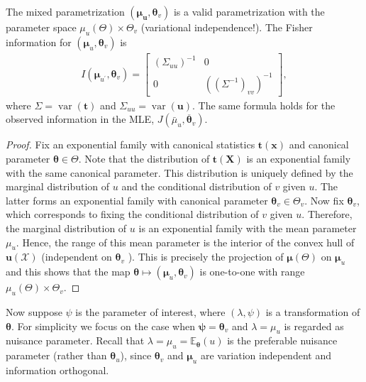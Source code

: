 \begin{prop}
    The mixed parametrization $(\boldsymbol{\mu}_{\boldsymbol{u}}, \boldsymbol{\theta}_v)$ is a valid parametrization with the parameter space $\mu_u(\Theta) \times \Theta_v$ (variational independence!). The Fisher information for $(\boldsymbol{\mu}_u, \boldsymbol{\theta}_v)$ is
\begin{align*}
I\left(\boldsymbol{\mu}_{u^{\prime}}, \boldsymbol{\theta}_v\right)=\left[\begin{array}{cc}
\left(\Sigma_{u u}\right)^{-1} & 0 \\
0 & \left(\left(\Sigma^{-1}\right)_{v v}\right)^{-1}
\end{array}\right],
\end{align*}
where $\Sigma=\operatorname{var}(\mathbf{t})$ and $\Sigma_{u u}=\operatorname{var}(\boldsymbol{u})$. The same formula holds for the observed information in the MLE, $J\left(\bar{\mu}_u, \overline{\boldsymbol{\theta}}_v\right)$.
\end{prop}

\begin{proof}
Fix an exponential family with canonical statistics $\mathbf{t}(\mathbf{x})$ and canonical parameter $\boldsymbol{\theta} \in \Theta$. Note that the distribution of $\mathbf{t}(\mathbf{X})$ is an exponential family with the same canonical parameter. This distribution is uniquely defined by the marginal distribution of $u$ and the conditional distribution of $v$ given $u$. The latter forms an exponential family with canonical parameter $\boldsymbol{\theta}_v \in \Theta_v$. Now fix $\boldsymbol{\theta}_v$, which corresponds to fixing the conditional distribution of $v$ given $u$. Therefore, the marginal distribution of $u$ is an exponential family with the mean parameter $\mu_u$. Hence, the range of this mean parameter is the interior of the convex hull of $\boldsymbol{u}(\mathcal{X})$ (independent on $\boldsymbol{\theta}_v$ ). This is precisely the projection of $\boldsymbol{\mu}(\Theta)$ on $\boldsymbol{\mu}_u$ and this shows that the map $\boldsymbol{\theta} \mapsto\left(\boldsymbol{\mu}_u, \boldsymbol{\theta}_v\right)$ is one-to-one with range $\mu_u(\Theta) \times \Theta_v$.
\end{proof}

Now suppose $\psi$ is the parameter of interest, where $(\lambda, \psi)$ is a transformation of $\boldsymbol{\theta}$. For simplicity we focus on the case when $\boldsymbol{\psi}=\boldsymbol{\theta}_v$ and $\lambda=\mu_u$ is regarded as nuisance parameter. Recall that $\lambda=\mu_u=\mathbb{E}_{\boldsymbol{\theta}}(u)$ is the preferable nuisance parameter (rather than $\boldsymbol{\theta}_u$), since $\boldsymbol{\theta}_v$ and $\boldsymbol{\mu}_u$ are variation independent and information orthogonal.

